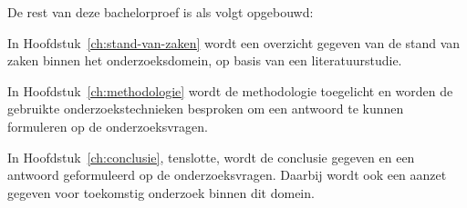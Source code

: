De rest van deze bachelorproef is als volgt opgebouwd:

In Hoofdstuk~\ref{ch:stand-van-zaken} wordt een overzicht gegeven van de stand van zaken binnen het onderzoeksdomein, op basis van een literatuurstudie.

In Hoofdstuk~\ref{ch:methodologie} wordt de methodologie toegelicht en worden de gebruikte onderzoekstechnieken besproken om een antwoord te kunnen formuleren op de onderzoeksvragen.


In Hoofdstuk~\ref{ch:conclusie}, tenslotte, wordt de conclusie gegeven en een antwoord geformuleerd op de onderzoeksvragen. Daarbij wordt ook een aanzet gegeven voor toekomstig onderzoek binnen dit domein.